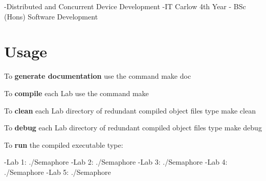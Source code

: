 -\/\+Distributed and Concurrent Device Development -\/\+IT Carlow 4th Year -\/ B\+Sc (Hons) Software Development

\section*{Usage}

To {\bfseries generate documentation} use the command make {\ttfamily doc}

To {\bfseries compile} each Lab use the command {\ttfamily make}

To {\bfseries clean} each Lab directory of redundant compiled object files type {\ttfamily make clean}

To {\bfseries debug} each Lab directory of redundant compiled object files type {\ttfamily make debug}

To {\bfseries run} the compiled executable type\+:

-\/\+Lab 1\+: {\ttfamily ./\+Semaphore} -\/\+Lab 2\+: {\ttfamily ./\+Semaphore} -\/\+Lab 3\+: {\ttfamily ./\+Semaphore} -\/\+Lab 4\+: {\ttfamily ./\+Semaphore} -\/\+Lab 5\+: {\ttfamily ./\+Semaphore} 